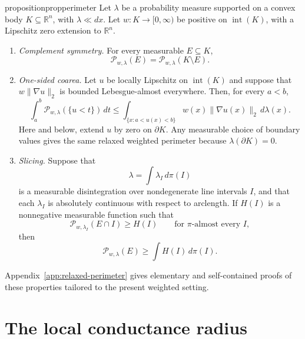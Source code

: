 \documentclass[11pt]{article}
\theoremstyle{definition}
\theoremstyle{remark}
\newcommand{\R}{\mathbb R}
\newcommand{\cP}{\mathcal P}
\begin{document}
\begin{restatable}{proposition}{propperimeter}
\label{prop:relaxed-perimeter-toolkit}
Let $\lambda$ be a probability measure supported on a convex body $K\subseteq\R^n$, with $\lambda\ll dx$.
Let \(w:K\to[0,\infty)\) be positive on \({\operatorname{int}(K)}\), with a Lipschitz zero
extension to \(\R^n\).

\begin{enumerate}[label=\textup{(\roman*)}]

\item \emph{Complement symmetry.}  For every measurable \(E\subseteq K\),
\[
 \cP_{w,\lambda}(E)=\cP_{w,\lambda}(K\setminus E).
\]

\item \emph{One-sided coarea.}
Let $u$ be locally Lipschitz on $\operatorname{int}(K)$ and suppose that $w\|\nabla u\|_2$ is bounded Lebesgue-almost everywhere.  Then, for every $a<b$,
\begin{equation}\label{eq:relaxed-coarea}
 \int_a^b
 \cP_{w,\lambda}(\{u<t\})\,dt
 \le
 \int_{\{x:a<u(x)<b\}}
 w(x)\|\nabla u(x)\|_2\,d\lambda(x).
\end{equation}
Here and below, extend \(u\) by zero on \(\partial K\).  Any measurable
choice of boundary values gives the same relaxed weighted perimeter because
\(\lambda(\partial K)=0\).

\item \emph{Slicing.}
Suppose that
\[
 \lambda=\int\lambda_I\,d\pi(I)
\]
is a measurable disintegration over nondegenerate line intervals \(I\), and that each \(\lambda_I\) is absolutely continuous with respect to arclength.  If \(H(I)\) is a nonnegative
measurable function such that
\[
 \cP_{w,\lambda_I}(E\cap I)\ge H(I)
 \qquad\text{for $\pi$-almost every }I,
\]
then
\begin{equation}\label{eq:slicing}
 \cP_{w,\lambda}(E)
 \ge
 \int H(I)\,d\pi(I).
\end{equation}
\end{enumerate}
\end{restatable}
Appendix~\ref{app:relaxed-perimeter} gives elementary and self-contained
proofs of these properties tailored to the present weighted setting.


\section{The local conductance radius}\label{sec:depth}
\end{document}
